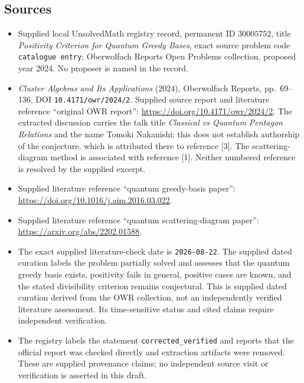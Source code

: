 \documentclass[11pt]{article}
\begin{document}
\subsection{Sources}
\begin{itemize}
\item Supplied local UnsolvedMath registry record, permanent ID \(30005752\), title \emph{Positivity Criterion for Quantum Greedy Bases}, exact source problem code \texttt{catalogue entry}; Oberwolfach Reports Open Problems collection, proposed year 2024. No proposer is named in the record.
\item \emph{Cluster Algebras and Its Applications} (2024), Oberwolfach Reports, pp.\ 69--136, DOI \texttt{10.4171/owr/2024/2}. Supplied source report and literature reference ``original OWR report'': \url{https://doi.org/10.4171/owr/2024/2}. The extracted discussion carries the talk title \emph{Classical vs Quantum Pentagon Relations} and the name Tomoki Nakanishi; this does not establish authorship of the conjecture, which is attributed there to reference [3]. The scattering-diagram method is associated with reference [1]. Neither numbered reference is resolved by the supplied excerpt.
\item Supplied literature reference ``quantum greedy-basis paper'': \url{https://doi.org/10.1016/j.aim.2016.03.022}.
\item Supplied literature reference ``quantum scattering-diagram paper'': \url{https://arxiv.org/abs/2202.01588}.
\item The exact supplied literature-check date is \texttt{2026-08-22}. The supplied dated curation labels the problem partially solved and assesses that the quantum greedy basis exists, positivity fails in general, positive cases are known, and the stated divisibility criterion remains conjectural. This is supplied dated curation derived from the OWR collection, not an independently verified literature assessment. Its time-sensitive status and cited claims require independent verification.
\item The registry labels the statement \texttt{corrected\_verified} and reports that the official report was checked directly and extraction artifacts were removed. These are supplied provenance claims; no independent source visit or verification is asserted in this draft.
\end{itemize}
\end{document}

